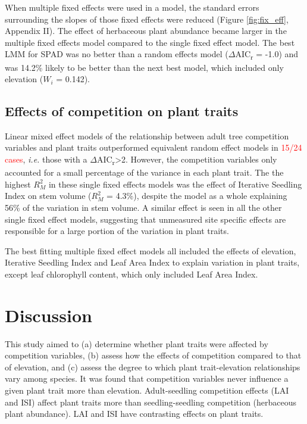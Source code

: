 \documentclass[a4paper, 11pt]{article}
\newcommand{\todo}[1]{\textcolor{red}{#1}}   %
\begin{document}
When multiple fixed effects were used in a model, the standard errors surrounding the slopes of those fixed effects were reduced (Figure \ref{fig:fix_eff}, Appendix II). The effect of herbaceous plant abundance became larger in the multiple fixed effects model compared to the single fixed effect model. The best LMM for SPAD was no better than a random effects model ($\Delta$AIC\textsubscript{r} = -1.0) and was 14.2\% likely to be better than the next best model, which included only elevation ($W_i$ = 0.142).

\subsection{Effects of competition on plant traits}

Linear mixed effect models of the relationship between adult tree competition variables and plant traits outperformed equivalent random effect models in \todo{15/24 cases}, \textit{i.e.} those with a $\Delta$AIC\textsubscript{r}>2. However, the competition variables only accounted for a small percentage of the variance in each plant trait. The the highest $R_M^2$ in these single fixed effects models was the effect of Iterative Seedling Index on stem volume ($R_M^2$ = 4.3\%), despite the model as a whole explaining 56\% of the variation in stem volume. A similar effect is seen in all the other single fixed effect models, suggesting that unmeasured site specific effects are responsible for a large portion of the variation in plant traits.

The best fitting multiple fixed effect models all included the effects of elevation, Iterative Seedling Index and Leaf Area Index to explain variation in plant traits, except leaf chlorophyll content, which only included Leaf Area Index. 


\section*{Discussion}

This study aimed to (a) determine whether plant traits were affected by competition variables, (b) assess how the effects of competition compared to that of elevation, and (c) assess the degree to which plant trait-elevation relationships vary among species. It was found that competition variables never influence a given plant trait more than elevation. Adult-seedling competition effects (LAI and ISI) affect plant traits more than seedling-seedling competition (herbaceous plant abundance). LAI and ISI have contrasting effects on plant traits.
\end{document}
